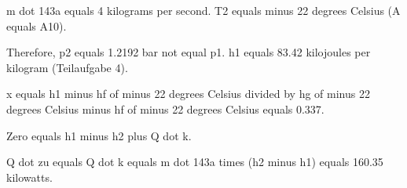 m dot 143a equals 4 kilograms per second. T2 equals minus 22 degrees Celsius (A equals A10).

Therefore, p2 equals 1.2192 bar not equal p1. h1 equals 83.42 kilojoules per kilogram (Teilaufgabe 4).

x equals h1 minus hf of minus 22 degrees Celsius divided by hg of minus 22 degrees Celsius minus hf of minus 22 degrees Celsius equals 0.337.

Zero equals h1 minus h2 plus Q dot k.

Q dot zu equals Q dot k equals m dot 143a times (h2 minus h1) equals 160.35 kilowatts.